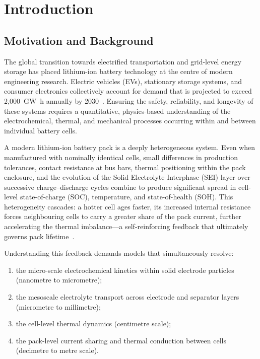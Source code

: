 \chapter{Introduction}
\label{ch:intro}

\section{Motivation and Background}
\label{sec:motivation}

The global transition towards electrified transportation and grid-level energy storage has placed lithium-ion battery technology at the centre of modern engineering research. Electric vehicles (EVs), stationary storage systems, and consumer electronics collectively account for demand that is projected to exceed 2,000~\si{\giga\watt\hour} annually by 2030~\cite{IEA2023}. Ensuring the safety, reliability, and longevity of these systems requires a quantitative, physics-based understanding of the electrochemical, thermal, and mechanical processes occurring within and between individual battery cells.

A modern lithium-ion battery pack is a deeply heterogeneous system. Even when manufactured with nominally identical cells, small differences in production tolerances, contact resistance at bus bars, thermal positioning within the pack enclosure, and the evolution of the Solid Electrolyte Interphase (SEI) layer over successive charge--discharge cycles combine to produce significant spread in cell-level state-of-charge (SOC), temperature, and state-of-health (SOH). This heterogeneity cascades: a hotter cell ages faster, its increased internal resistance forces neighbouring cells to carry a greater share of the pack current, further accelerating the thermal imbalance---a self-reinforcing feedback that ultimately governs pack lifetime~\cite{Gogoana2014,Baumhofer2014}.

Understanding this feedback demands models that simultaneously resolve:
\begin{enumerate}[noitemsep]
  \item the micro-scale electrochemical kinetics within solid electrode particles (nanometre to micrometre);
  \item the mesoscale electrolyte transport across electrode and separator layers (micrometre to millimetre);
  \item the cell-level thermal dynamics (centimetre scale);
  \item the pack-level current sharing and thermal conduction between cells (decimetre to metre scale).
\end{enumerate}

